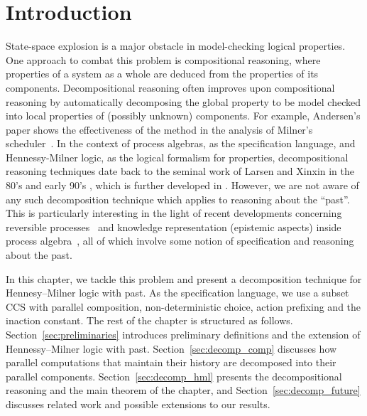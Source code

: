 \section{Introduction}
State-space explosion is a major obstacle in model-checking logical properties.
One approach to combat this problem is compositional reasoning,
where properties of a system as a whole are deduced from the properties of its components.
Decompositional reasoning \cite{Giannakopoulou05,Xie05,Andersen95,LaroussinieL95,Larsen91} 
often improves upon compositional reasoning by
automatically decomposing the global property to be model checked
into local properties of (possibly unknown) components.
For example, Andersen's paper shows the effectiveness of the method in the analysis of Milner's scheduler~\cite{Milner89a}.
In the context of process algebras, as the specification language, and Hennessy-Milner logic, as the logical formalism for properties,
decompositional reasoning techniques date back to the seminal work of Larsen and Xinxin 
in the 80's and early 90's \cite{Larsen91},
which is further developed in \cite{anna87,Simpson04,Fokkink06}.
However, we are not aware of any such decomposition technique which applies to reasoning about the ``past''.
This is particularly interesting in the light of recent developments concerning reversible processes~\cite{Phillips06} and
knowledge representation (epistemic aspects) inside process 
algebra~\cite{Mousavi07-LPAR,borgstrom06,hommersom04,Raimondi2007,Halpern05},
all of which involve some notion of specification and reasoning about the past.

In this chapter, we tackle this problem and present a decomposition technique for Hennesy--Milner logic with past.
As the specification language, we use a subset CCS with parallel composition, non-deterministic choice, action prefixing
and the inaction constant.
%
The rest of the chapter is structured as follows. Section~\ref{sec:preliminaries}
introduces preliminary definitions and the extension of Hennessy--Milner logic
with past. Section~\ref{sec:decomp_comp} discusses how parallel computations that maintain
their history are decomposed into their parallel components. Section~\ref{sec:decomp_hml}
presents the decompositional reasoning and the main theorem of the chapter, and
Section~\ref{sec:decomp_future} discusses related work and possible extensions to our results.

